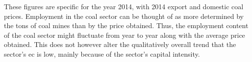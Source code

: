 \documentclass[12pt,english]{article}
\begin{document}


These figures are specific for the year 2014, with 2014 export and domestic coal prices. Employment in the coal sector can be thought of as more determined by the tons of coal mines than by the price obtained. Thus, the employment content of the coal sector might fluctuate from year to year along with the average price obtained. This does not however alter the qualitatively overall trend that the sector's ec is low, mainly because of the sector's capital intensity.






\end{document}
